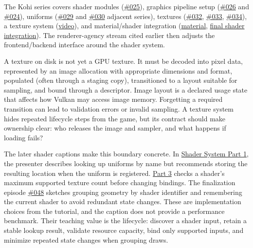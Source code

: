 The Kohi series covers shader modules (\href{https://www.youtube.com/watch?v=01KQiQ4fdXs}{\#025}), graphics pipeline setup (\href{https://www.youtube.com/watch?v=OmPmftW7Kjg}{\#026} and \href{https://www.youtube.com/watch?v=KanKG-vd9GA}{\#024}), uniforms (\href{https://www.youtube.com/watch?v=yc40ixalLtU}{\#029} and \href{https://www.youtube.com/watch?v=xGonaV-OB7E}{\#030} adjacent series), textures (\href{https://www.youtube.com/watch?v=u-eyZCV_MRs}{\#032}, \href{https://www.youtube.com/watch?v=n7qS96720yI}{\#033}, \href{https://www.youtube.com/watch?v=2IxHj52-Kag}{\#034}), a texture system (\href{https://www.youtube.com/watch?v=hDpzfAdW3vw}{video}), and material/shader integration (\href{https://www.youtube.com/watch?v=K_jD7--h7F8}{material}, \href{https://www.youtube.com/watch?v=9nP3aBsrCXs}{final shader integration}). The renderer-agency stream cited earlier then adjusts the frontend/backend interface around the shader system.

A texture on disk is not yet a GPU texture. It must be decoded into pixel data, represented by an image allocation with appropriate dimensions and format, populated (often through a staging copy), transitioned to a layout suitable for sampling, and bound through a descriptor. Image layout is a declared usage state that affects how Vulkan may access image memory. Forgetting a required transition can lead to validation errors or invalid sampling. A texture system hides repeated lifecycle steps from the game, but its contract should make ownership clear: who releases the image and sampler, and what happens if loading fails?

The later shader captions make this boundary concrete. In \href{https://www.youtube.com/watch?v=wXLsGqck100}{Shader System Part 1}, the presenter describes looking up uniforms by name but recommends storing the resulting location when the uniform is registered. \href{https://www.youtube.com/watch?v=4E0v_5Wva-8}{Part 3} checks a shader's maximum supported texture count before changing bindings. The finalization episode \href{https://www.youtube.com/watch?v=9nP3aBsrCXs}{\#048} sketches grouping geometry by shader identifier and remembering the current shader to avoid redundant state changes. These are implementation choices from the tutorial, and the caption does not provide a performance benchmark. Their teaching value is the lifecycle: discover a shader input, retain a stable lookup result, validate resource capacity, bind only supported inputs, and minimize repeated state changes when grouping draws.

